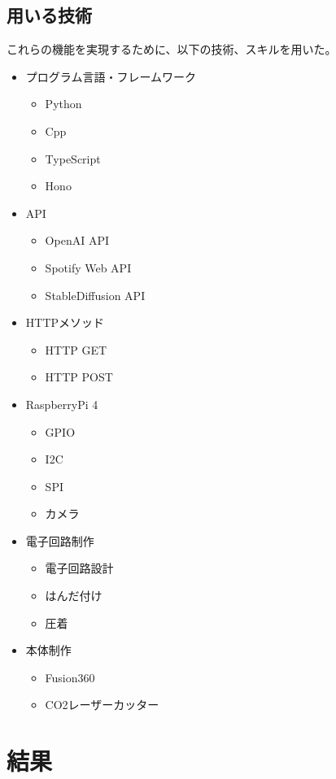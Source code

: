 \section{用いる技術}
これらの機能を実現するために、以下の技術、スキルを用いた。
\begin{itemize}
  \item プログラム言語・フレームワーク
  \begin{itemize}
    \item Python
    \item Cpp
    \item TypeScript
    \item Hono
  \end{itemize}
  \item API
  \begin{itemize}
    \item OpenAI API
    \item Spotify Web API
    \item StableDiffusion API
  \end{itemize}
  \item HTTPメソッド
  \begin{itemize}
    \item HTTP GET
    \item HTTP POST
  \end{itemize}
  \item RaspberryPi 4
  \begin{itemize}
    \item GPIO
    \item I2C
    \item SPI
    \item カメラ
  \end{itemize}
  \item 電子回路制作
  \begin{itemize}
    \item 電子回路設計
    \item はんだ付け
    \item 圧着
  \end{itemize}
  \item 本体制作
  \begin{itemize}
    \item Fusion360
    \item CO2レーザーカッター
  \end{itemize}
\end{itemize}

\chapter{結果}
